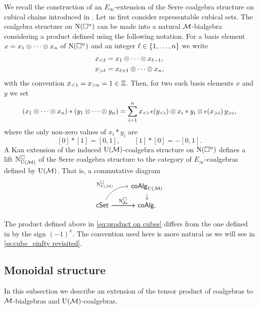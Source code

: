 We recall the construction of an $E_\infty$-extension of the Serre coalgebra structure on cubical chains introduced in \cite{medina2022cube_einfty}.
Let us first consider representable cubical sets.
The coalgebra structure on $\operatorname{N}(\square^n)$ can be made into a natural $\mathcal{M}$-bialgebra considering a product defined using the following notation.
For a basis element $x = x_1 \otimes \dotsb \otimes x_n$ of $\operatorname{N}(\square^n)$ and an integer $\ell \in \{1,\dots,n\}$ we write
\begin{align*}
	x_{<\ell} & = x_1 \otimes \dotsb \otimes x_{\ell-1}, \\
	x_{>\ell} & = x_{\ell+1} \otimes \dotsb \otimes x_n,
\end{align*}
with the convention $x_{<1} = x_{>n} = 1 \in \mathbb{Z}$.
Then, for two such basis elements $x$ and $y$ we set
\begin{equation}\label{eq:product on cubes}
	(x_1 \otimes \dotsb \otimes x_n) \ast (y_1 \otimes \dotsb \otimes y_n) =
	\sum_{i=1}^n x_{<i}\, \epsilon(y_{<i}) \otimes x_i \ast y_i \otimes \epsilon(x_{>i}) \, y_{>i},
\end{equation}
where the only non-zero values of $x_i \ast y_i$ are
\[
[0] \ast [1] = [0, 1], \qquad [1] \ast [0] = -[0, 1].
\]
A Kan extension of the induced ${\operatorname{U}(\mathcal{M})}$-coalgebra structure on $\operatorname{N}(\square^n)$ defines a lift $\operatorname{N^{\square}_{{\operatorname{U}(\mathcal{M})}}}$ of the Serre coalgebra structure to the category of $E_\infty$-coalgebras defined by ${\operatorname{U}(\mathcal{M})}$.
That is, a commutative diagram
\begin{equation}\label{eq:lift to e-infty cubical}
	\begin{tikzcd}[column sep=normal, row sep=small]
		& \coAlg_{\UM} \arrow[d] \\
		\cSet \arrow[r]
		\arrow[ur,out=60, in=180, "\cchainsUM"]
		\arrow[r, "\cchainsA"]
		& \coAlg.
	\end{tikzcd}
\end{equation}

\begin{remark*}
	The product defined above in \cref{eq:product on cubes} differs from the one defined in \cite{medina2022cube_einfty} by the sign $(-1)^x$.
	The convention used here is more natural as we will see in \cref{ss:cube_einfty revisited}.
\end{remark*}

\subsection{Monoidal structure}\label{ss:monoidal structures}

In this subsection we describe an extension of the tensor product of coalgebras to $\mathcal{M}$-bialgebras and ${\operatorname{U}(\mathcal{M})}$-coalgebras.


